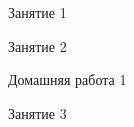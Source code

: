 
\begin{class}[number=1]
	\begin{listofex}
		\item Занятие 1
	\end{listofex}
\end{class}

\begin{class}[number=2]
	\begin{listofex}
		\item Занятие 2
	\end{listofex}
\end{class}

\begin{homework}[number=1]
	\begin{listofex}
		\item Домашняя работа 1
	\end{listofex}
\end{homework}

\begin{class}[number=3]
	\begin{listofex}
		\item Занятие 3 
	\end{listofex}
\end{class}

